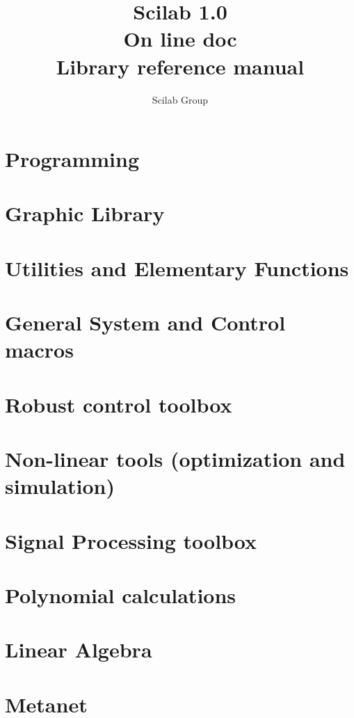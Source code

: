 
             \title{\Huge\bf Scilab 1.0 \\ On line doc \\ Library reference manual}
             \author{\huge Scilab Group}
             \textheight=660pt 
             \textwidth=470pt
             \topmargin=-27pt 
             \oddsidemargin=-1.2cm
             \evensidemargin=0.7cm
             \marginparwidth=60pt
\def\vector#1{\left( \begin{array}{c} #1  \end{array}\right)}
\def\matrixq#1{\left( \begin{array}{cc} #1  \end{array}\right)}

\makeindex 


\maketitle


\chapter{Programming}
	 
\chapter{Graphic Library }
	 
\chapter{Utilities and Elementary Functions}
	 
\chapter{General System and Control macros}
	 
\chapter{Robust control toolbox}
	 
\chapter{Non-linear tools (optimization and simulation) }
	 
\chapter{Signal Processing toolbox}
	 
\chapter{Polynomial calculations}
	
\chapter{Linear Algebra}
	
\chapter{Metanet}
	

\printindex

